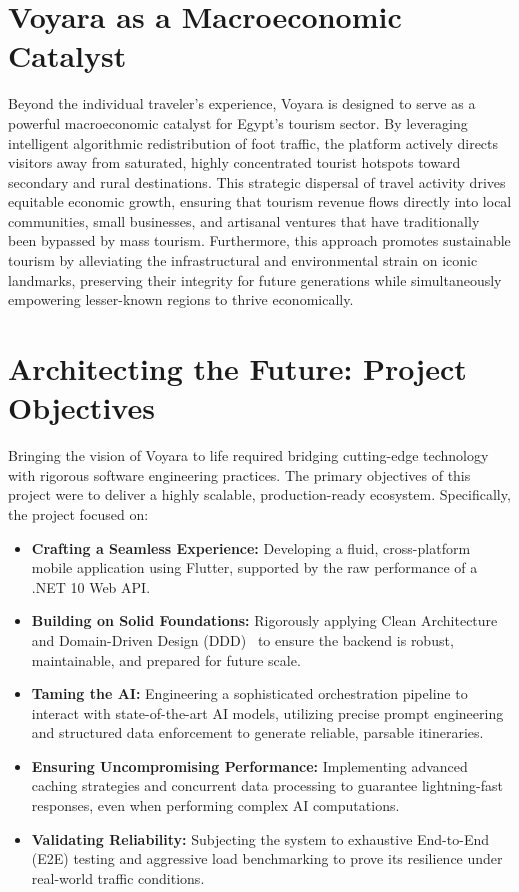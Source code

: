 \section{Voyara as a Macroeconomic Catalyst}
Beyond the individual traveler's experience, Voyara is designed to serve as a powerful macroeconomic catalyst for Egypt's tourism sector. By leveraging intelligent algorithmic redistribution of foot traffic, the platform actively directs visitors away from saturated, highly concentrated tourist hotspots toward secondary and rural destinations. This strategic dispersal of travel activity drives equitable economic growth, ensuring that tourism revenue flows directly into local communities, small businesses, and artisanal ventures that have traditionally been bypassed by mass tourism. Furthermore, this approach promotes sustainable tourism by alleviating the infrastructural and environmental strain on iconic landmarks, preserving their integrity for future generations while simultaneously empowering lesser-known regions to thrive economically.

\section{Architecting the Future: Project Objectives}
Bringing the vision of Voyara to life required bridging cutting-edge technology with rigorous software engineering practices. The primary objectives of this project were to deliver a highly scalable, production-ready ecosystem. Specifically, the project focused on:

\begin{itemize}
    \item \textbf{Crafting a Seamless Experience:} Developing a fluid, cross-platform mobile application using Flutter, supported by the raw performance of a .NET 10 Web API.
    \item \textbf{Building on Solid Foundations:} Rigorously applying Clean Architecture~\cite{martin2012clean} and Domain-Driven Design (DDD)~\cite{evans2003domain} to ensure the backend is robust, maintainable, and prepared for future scale.
    \item \textbf{Taming the AI:} Engineering a sophisticated orchestration pipeline to interact with state-of-the-art AI models, utilizing precise prompt engineering and structured data enforcement to generate reliable, parsable itineraries.
    \item \textbf{Ensuring Uncompromising Performance:} Implementing advanced caching strategies and concurrent data processing to guarantee lightning-fast responses, even when performing complex AI computations.
    \item \textbf{Validating Reliability:} Subjecting the system to exhaustive End-to-End (E2E) testing and aggressive load benchmarking to prove its resilience under real-world traffic conditions.
\end{itemize}

